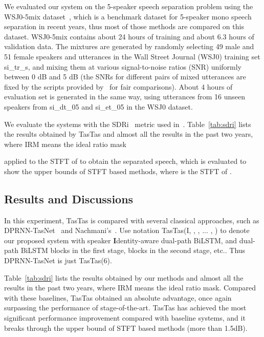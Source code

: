 \documentclass{article}
\numberwithin{equation}{section}
\theoremstyle{remark}
\begin{document}
We evaluated our system on the 5-speaker speech separation problem using the 
WSJ0-5mix dataset~\cite{nachmani2020voice},
which is a benchmark dataset for 5-speaker mono speech separation in recent years, 
thus most of those methods are compared on this dataset.
WSJ0-5mix contains about 24 hours of training and about 6.3 hours of validation data. 
The mixtures are generated by randomly selecting 49 male and 51 female
speakers and utterances in the Wall Street Journal (WSJ0) training set si\_tr\_s, and 
mixing them at various signal-to-noise ratios (SNR) uniformly
between 0 dB and 5 dB (the SNRs for different pairs of mixed utterances are fixed by 
the scripts provided by~\cite{nachmani2020voice}
for fair comparisons). About 4 hours of evaluation set is generated in the same way, 
using utterances from 16 unseen speakers from si\_dt\_05 and si\_et\_05
in the WSJ0 dataset.

We evaluate the systems with the  SDRi~\cite{fevotte2005bss,vincent2006performance} 
metric used
in~\cite{isik2016single,luo2018speaker, chen2017deep,liu2019divide,wang2019deep}. 
Table~\ref{tab:sdri} lists the
results obtained by TasTas and almost all the results in the past two years, 
where IRM means the ideal ratio mask

applied to the STFT  of  to obtain the separated speech, 
which is evaluated to show the upper bounds of
STFT based methods, where  is the STFT of .




\subsection{Results and Discussions}
\label{ssec:results}

In this experiment,  TasTas is compared with several classical approaches, such as
DPRNN-TasNet~\cite{luo2019dual} and Nachmani's~\cite{nachmani2020voice}. Use 
notation TasTas(I, , , ... , ) to
denote our proposed system with  speaker \textbf{I}dentity-aware dual-path  BiLSTM, and   
dual-path BiLSTM blocks in the
first stage,  blocks in the second stage, etc..
Thus DPRNN-TasNet is just TasTas(6).

Table~\ref{tab:sdri} lists the results obtained by our methods and almost all the results in the past two years,
where IRM means the ideal ratio mask. Compared with these baselines, TasTas obtained an absolute advantage,
once again surpassing the performance of stage-of-the-art. TasTas has achieved the most significant performance improvement
compared with baseline systems, and it breaks through the upper bound of STFT based methods (more than 1.5dB).
\end{document}
